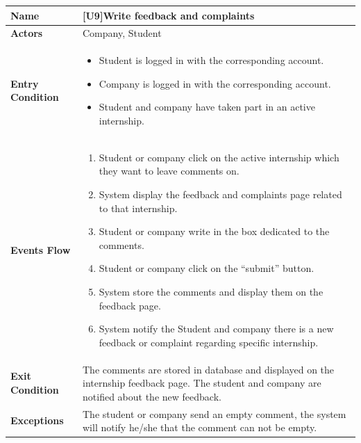 \begin{center}
    \begin{tabular}{|p{9em}|p{27em}|}
        \hline
        \rowcolor{bluepoli!40} %
        \textbf{Name} & \textbf{[U9]Write feedback and complaints} \\
        \hline
        \textbf{Actors} & Company, Student\\
        \hline
        \textbf{Entry Condition} & 
        \begin{itemize}
            \item Student is logged in with the corresponding account.
            \item Company is logged in with the corresponding account.
            \item Student and company have taken part in an active internship.
        \end{itemize} \\
        \hline
        \textbf{Events Flow} & 
        \begin{enumerate}
            \item Student or company click on the active internship which they want to leave comments on.
            \item System display the feedback and complaints page related to that internship.
            \item Student or company write in the box dedicated to the comments.
            \item Student or company click on the ``submit'' button.
            \item System store the comments and display them on the feedback page.
            \item System notify the Student and company there is a new feedback or complaint regarding specific internship.
        \end{enumerate} \\
        \hline
        \textbf{Exit Condition} & 
         The comments are stored in database and displayed on the internship feedback page. The student and company are notified about the new feedback.\\
        \hline
        \textbf{Exceptions} &
        The student or company send an empty comment, the system will notify he/she that the comment can not be empty.\\
        \hline
    \end{tabular}
\end{center}

